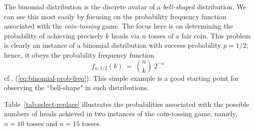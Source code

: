 \bigskip

 

The binomial distribution is the discrete avatar of a {\em bell-shaped} distribution.  We can see this most easily by focusing on the probability frequency function associated with the {\em coin-tossing} game.  The focus here is on determining the probability of achieving precisely $k$ {\sc head}s via $n$ tosses of a fair coin.  This problem is clearly an instance of a binomial distribution with success probability $p = 1/2$; hence, it obeys the probability frequency function 
\[ f_{n,1/2}(k) \ = \  {n \choose k} \ 2^{-n} \] 
cf., (\ref{eq:binomial-prob-freq}).  This simple example is a good starting point for observing the ``bell-shape" in such distributions.

Table~\ref{tab:select-replace} illustrates the probabilities associated with the possible numbers of {\sc head}s achieved in two instances of the coin-tossing game, namely, $n = 10$ tosses and $n= 15$ tosses.  

